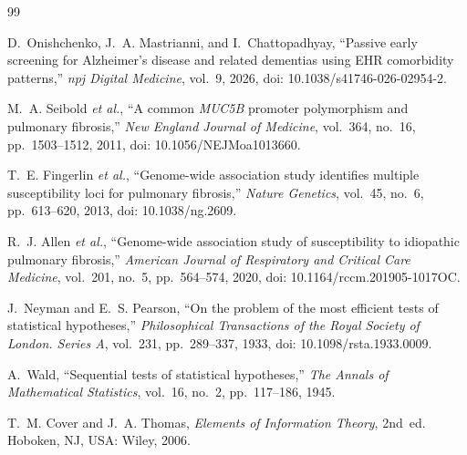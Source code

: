 \documentclass[journal]{IEEEtran}
\begin{document}
\begin{thebibliography}{99}

D.~Onishchenko, J.~A. Mastrianni, and I.~Chattopadhyay,
``Passive early screening for Alzheimer's disease and related dementias using EHR comorbidity patterns,''
\emph{npj Digital Medicine}, vol.~9, 2026, doi: 10.1038/s41746-026-02954-2.

M.~A. Seibold \emph{et al.},
``A common \textit{MUC5B} promoter polymorphism and pulmonary fibrosis,''
\emph{New England Journal of Medicine}, vol.~364, no.~16, pp.~1503--1512, 2011, doi: 10.1056/NEJMoa1013660.

T.~E. Fingerlin \emph{et al.},
``Genome-wide association study identifies multiple susceptibility loci for pulmonary fibrosis,''
\emph{Nature Genetics}, vol.~45, no.~6, pp.~613--620, 2013, doi: 10.1038/ng.2609.

R.~J. Allen \emph{et al.},
``Genome-wide association study of susceptibility to idiopathic pulmonary fibrosis,''
\emph{American Journal of Respiratory and Critical Care Medicine}, vol.~201, no.~5, pp.~564--574, 2020, doi: 10.1164/rccm.201905-1017OC.

J.~Neyman and E.~S. Pearson,
``On the problem of the most efficient tests of statistical hypotheses,''
\emph{Philosophical Transactions of the Royal Society of London. Series A}, vol.~231, pp.~289--337, 1933, doi: 10.1098/rsta.1933.0009.

A.~Wald,
``Sequential tests of statistical hypotheses,''
\emph{The Annals of Mathematical Statistics}, vol.~16, no.~2, pp.~117--186, 1945.

T.~M. Cover and J.~A. Thomas,
\emph{Elements of Information Theory}, 2nd~ed.
Hoboken, NJ, USA: Wiley, 2006.

\end{thebibliography}
\end{document}
